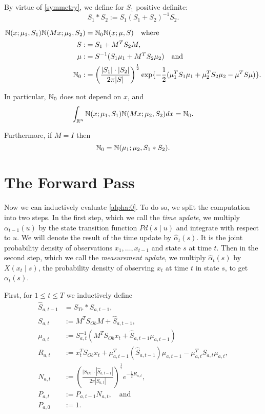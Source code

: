 \documentclass[12pt,leqno]{article}
\begin{document}
By virtue of \eqref{symmetry}, we define for $S_1$ positive definite:
$$
S_1*S_2 := S_1(S_1+S_2)^{-1}S_2.
$$

\begin{Cor}\label{comp_sq:2}
\begin{align*}
  {\mathbb N}(x;\mu_1,S_1){\mathbb N}(Mx;\mu_2,S_2) &= {\mathbb N}_0{\mathbb N}(x;\mu,S)\quad\text{where}\\
  S :&= S_1+M^TS_2M,\\
  \mu :&= S^{-1}(S_1\mu_1 + M^TS_2\mu_2)\quad\text{and} \\
  {\mathbb N}_0 :&= \left(\frac{|S_1|\cdot|S_2|}{2\pi|S|}\right)^{\frac{1}{2}}\exp\{-\frac{1}{2}(\mu_1^TS_1\mu_1 + \mu_2^TS_2\mu_2-\mu^TS\mu)\}.
\end{align*}

In particular, ${\mathbb N}_0$ does not depend on $x$, and
\begin{equation}\label{comp_sq:int}
  \int_{{\mathbb R}^{n}}  {\mathbb N}(x;\mu_1,S_1){\mathbb N}(Mx;\mu_2,S_2)dx = {\mathbb N}_0.
\end{equation}

Furthermore, if $M = I$ then 
\begin{equation}\label{exact_prod} 
  {\mathbb N}_0 = {\mathbb N}(\mu_1;\mu_2,S_1*S_2).
\end{equation}
\end{Cor}

\section{The Forward Pass}
  Now we can inductively evaluate \eqref{alpha:0}. To do so, we split the computation
  into two steps.  In the first step, which we call the {\em time update}, we multiply
  $\alpha_{t-1}(u)$ by the state transition function $Pd(s\mid u)$ and integrate with respect
  to $u$. We will denote the result of the time update by $\hat{\alpha}_t(s)$.  It is the joint probability
  density of observations $x_1,\dots,x_{t-1}$ and state $s$ at time $t$.
  Then in the second step, which we call the {\em measurement update}, we multiply
  $\hat{\alpha}_t(s)$ by $X(x_t \mid s)$, the probability density of observing $x_t$ at time $t$
  in state $s$, to get $\alpha_t(s)$.

  First, for $1\le t \le T$ we inductively define
  \begin{align*}
    \hat{S}_{a,t-1} &= S_{Tr}*S_{a,t-1},\\
    S_{a,t} &:= M^TS_{Ob}M + \hat{S}_{a,t-1},\\
    \mu_{a,t} &:= S_{a,t}^{-1}(M^TS_{Ob}x_t + \hat{S}_{a,t-1}\mu_{a,t-1})\\
    R_{a,t} &:= x_t^TS_{Ob}x_t + \mu_{a,t-1}^T(\hat{S}_{a,t-1})\mu_{a,t-1} - \mu_{a,t}^TS_{a,t}\mu_{a,t},\\
    N_{a,t} &:= \left(\frac{|S_{Ob}|\cdot|\hat{S}_{a,t-1}|}{2\pi|S_{a,t}|}\right)^{\frac{1}{2}}e^{-\frac{1}{2}R_{a,t}},\\
    P_{a,t} &:= P_{a,t-1}N_{a,t}, \quad\text{and}\\
    P_{a,0} &:= 1.
  \end{align*}
\end{document}
